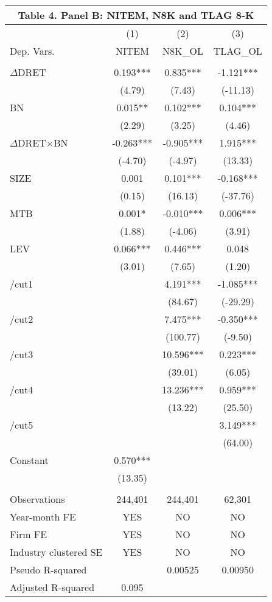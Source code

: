 \begin{table}[htbp] \label{T4PB}
  \centering
    \begin{tabular}{lccc}
    \multicolumn{4}{c}{\textbf{Table 4. Panel B: NITEM, N8K and TLAG 8-K}} \\
    \midrule
      & (1) & (2) & (3) \\
    Dep. Vars. & NITEM & N8K\_OL & TLAG\_OL \\
    \midrule
      &   &   &  \\
    $\Delta$DRET & 0.193*** & 0.835*** & -1.121*** \\
    & (4.79) & (7.43) & (-11.13) \\
    BN & 0.015** & 0.102*** & 0.104*** \\
    & (2.29) & (3.25) & (4.46) \\
    \rowcolor[rgb]{ .933,  .925,  .882} $\Delta$DRET$\times$BN & -0.263*** & -0.905*** & 1.915*** \\
    \rowcolor[rgb]{ .933,  .925,  .882}   & (-4.70) & (-4.97) & (13.33) \\
    SIZE & 0.001 & 0.101*** & -0.168*** \\
    & (0.15) & (16.13) & (-37.76) \\
    MTB & 0.001* & -0.010*** & 0.006*** \\
    & (1.88) & (-4.06) & (3.91) \\
    LEV & 0.066*** & 0.446*** & 0.048 \\
    & (3.01) & (7.65) & (1.20) \\
    /cut1 &   & 4.191*** & -1.085*** \\
    &   & (84.67) & (-29.29) \\
    /cut2 &   & 7.475*** & -0.350*** \\
    &   & (100.77) & (-9.50) \\
    /cut3 &   & 10.596*** & 0.223*** \\
    &   & (39.01) & (6.05) \\
    /cut4 &   & 13.236*** & 0.959*** \\
    &   & (13.22) & (25.50) \\
    /cut5 &   &   & 3.149*** \\
    &   &   & (64.00) \\
    Constant & 0.570*** &   &  \\
    & (13.35) &   &  \\
    &   &   &  \\
    Observations & 244,401 & 244,401 & 62,301 \\
    Year-month FE & YES & NO & NO \\
    Firm FE & YES & NO & NO \\
    Industry clustered SE & YES & NO & NO \\
    Pseudo R-squared &   & 0.00525 & 0.00950 \\
    Adjusted R-squared & 0.095 &   &  \\
    \bottomrule
    
    \end{tabular}%
\end{table}%
